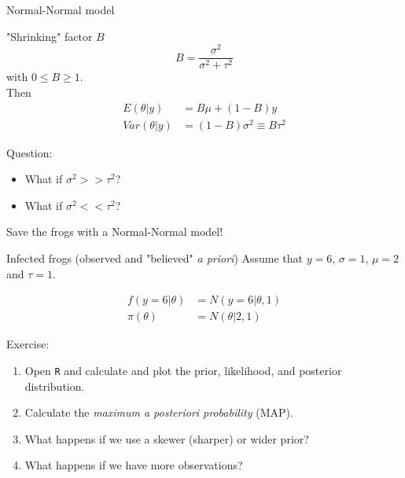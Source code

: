 \begin{frame}{Normal-Normal model}

	\begin{block}{"Shrinking" factor $B$}
		\begin{equation}
			B = \frac{\sigma^2}{\sigma^2+\tau^2}
		\end{equation}
		with $0 \leq B \geq 1$. \\Then
		\begin{align}
			E(\theta|y) &= B\mu + (1-B)y\\
			Var(\theta|y) &= (1-B)\sigma^2 \equiv B\tau^2
		\end{align}
	\end{block} 

	\pause

	Question:\\
	\begin{itemize}
		\item What if $\sigma^2>>\tau^2$?
		\item What if $\sigma^2<<\tau^2$?
	\end{itemize}

\end{frame}

\begin{frame}{Save the frogs with a Normal-Normal model!}

	\begin{block}{Infected frogs (observed and "believed" \textit{a priori})}
		Assume that $y=6$, $\sigma=1$, $\mu=2$ and $\tau=1$.
	\end{block}

	 \begin{align}
         	f(y=6|\theta) &= N(y=6|\theta, 1)\\
              	\pi(\theta) &= N(\theta|2, 1)
	\end{align}

	\pause
	
	Exercise:\\
	\begin{enumerate}
		\item Open \texttt{R} and calculate and plot the prior, likelihood, 
		and posterior distribution.
		\item Calculate the \textit{maximum a posteriori probability} (MAP).
		\item What happens if we use a skewer (sharper) or wider prior?
		\item What happens if we have more observations?
	\end{enumerate}

\end{frame}

